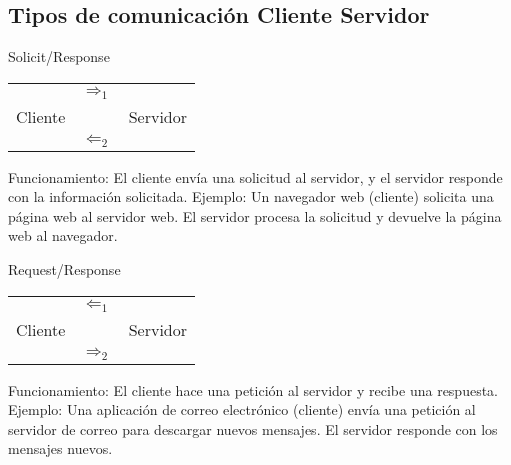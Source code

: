 \subsection{Tipos de comunicación Cliente Servidor}

\begin{center}
\begin{minipage}[t]{0.45\textwidth}
    \begin{center}
        Solicit/Response    

        \begin{tabular}{c c c}
                    & $\Rightarrow_{1}$ &  \\ 
            Cliente &               & Servidor \\
                    & $\Leftarrow_{2}$ &  \\ 
        \end{tabular}
    \end{center}

    Funcionamiento: El cliente envía una solicitud al servidor, y el servidor responde con la información solicitada.
    Ejemplo: Un navegador web (cliente) solicita una página web al servidor web. El servidor procesa la solicitud y devuelve la página web al navegador.
\end{minipage}
\hspace{15mm}
\begin{minipage}[t]{0.45\textwidth}
    \begin{center}
        Request/Response    

        \begin{tabular}{c c c}
                    & $\Leftarrow_{1}$ &  \\                 
            Cliente &               & Servidor \\
                    & $\Rightarrow_{2}$ &  \\ 
        
        \end{tabular}
    \end{center}

    Funcionamiento: El cliente hace una petición al servidor y recibe una respuesta. 
    Ejemplo: Una aplicación de correo electrónico (cliente) envía una petición al servidor de correo para descargar nuevos mensajes. El servidor responde con los mensajes nuevos.
\end{minipage}
\end{center}


